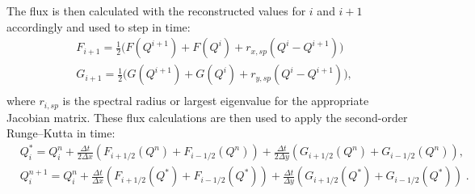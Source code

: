 \documentclass[preprints,article,accept,moreauthors,pdftex]{Definitions/mdpi}
\def\oldCPU{Intel Skylake Silver 4114} %
\def\oldGPU{Nvidia GeForce GTX 1080 Ti}
\def\newCPU{Intel E5-2698v4} %
\def\newGPU{Nvidia Tesla V100-DGXS-32GB}
\begin{document}
The flux is then calculated with the reconstructed values for $i$ and $i+1$ accordingly and used to step in time:
\begin{align*}
    &F_{i+1} = \frac{1}{2}\big( F(Q^{i+1})+F(Q^{i})+r_{x,sp}(Q^{i}-Q^{i+1})\big)\\
    &G_{i+1} = \frac{1}{2}\big( G(Q^{i+1})+G(Q^{i})+r_{y,sp}(Q^{i}-Q^{i+1})\big),\\
\end{align*}
where $r_{i,sp}$ is the spectral radius or largest eigenvalue for the appropriate Jacobian matrix. 
These flux calculations are then used to apply the second-order Runge--Kutta in time:
\begin{align*}
    &Q_i^{*} = Q_i^{n}+\frac{\Delta t}{2\Delta x}(F_{i+1/2}(Q^n)+F_{i-1/2}(Q^n))+\frac{\Delta t}{2\Delta y}(G_{i+1/2}(Q^n)+G_{i-1/2}(Q^n)),\\
    &Q_i^{n+1} = Q_i^{n}+\frac{\Delta t}{\Delta x}(F_{i+1/2}(Q^*)+F_{i-1/2}(Q^*))+\frac{\Delta t}{\Delta y}(G_{i+1/2}(Q^*)+G_{i-1/2}(Q^*)) \;.
\end{align*}



\end{document}
